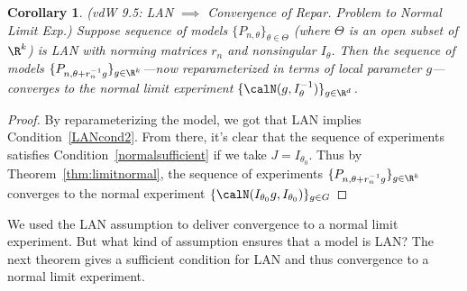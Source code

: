 \documentclass[12pt]{article}
\theoremstyle{plain}
\newtheorem{cor}[thm]{Corollary}
\theoremstyle{definition}
\theoremstyle{remark}
\begin{document}
\begin{cor}
\emph{(vdW 9.5: LAN $\implies$ Convergence of Repar. Problem to Normal Limit Exp.)}
Suppose sequence of models $\{P_{n,\theta}\}_{\theta\in\Theta}$ (where
$\Theta$ is an open subset of $\R^k$) is LAN with norming matrices $r_n$
and nonsingular $I_\theta$.
Then the sequence of models
$\{P_{n,\theta+r_n^{-1}g}\}_{g\in \R^k}$---now reparameterized in terms
of local parameter $g$---converges to the normal limit experiment
$\{\calN(g,I_\theta^{-1})\}_{g\in \R^d}$.
\end{cor}
\begin{proof}
By reparameterizing the model, we got that LAN implies
Condition~\ref{LANcond2}.
From there, it's clear that the sequence of experiments satisfies
Condition~\ref{normalsufficient} if we take $J=I_{\theta_0}$.
Thus by Theorem~\ref{thm:limitnormal}, the sequence of experiments
$\{P_{n,\theta+r_n^{-1}g}\}_{g\in \R^k}$ converges to the normal
experiment $\{\calN(I_{\theta_0}g,I_{\theta_0})\}_{g\in G}$
\end{proof}

We used the LAN assumption to deliver convergence to a normal limit
experiment.
But what kind of assumption ensures that a model is LAN?
The next theorem gives a sufficient condition for LAN and thus
convergence to a normal limit experiment.
\end{document}
